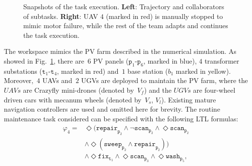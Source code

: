 \begin{figure}[t!]
\begin{minipage}[t]{0.49\linewidth}
\end{minipage}%
\caption{Snapshots of the task execution. \textbf{Left}:
Trajectory and collaborators of subtasks.
\textbf{Right}: UAV $4$ (marked in red) is manually stopped to mimic motor failure,
while the rest of the team adapts and continues
the task execution.}
\label{fig:ws}
\end{figure}

The workspace mimics the PV farm described in the numerical simulation.
As showed in Fig.~\ref{fig:ws},
there are~$6$ PV panels ($\texttt{p}_1$-$\texttt{p}_6$, marked in blue),
$4$ transformer substations
($\texttt{t}_1$-$\texttt{t}_4$, marked in red)
and~$1$ base station ($b_1$ marked in yellow).
Moreover,~$4$ UAVs and~$2$ UGVs are deployed to maintain the PV farm,
where the $UAVs$ are Crazyfly mini-drones (denoted by~$V_f$) and
the $UGVs$ are four-wheel driven cars with mecanum wheels (denoted by~$V_s$, $V_l$).
Existing mature navigation controllers are used and omitted here for brevity.
The routine maintenance task considered can be specified with the following LTL formulas:
\begin{equation}
\begin{aligned}
	\varphi_4=& \Diamond(\texttt{repair}_{\texttt{p}_2} \land  \lnot\texttt{scan}_{\texttt{p}_2} \land \Diamond
	\texttt{scan}_{\texttt{p}_2} \\
	&\land \Diamond (\texttt{sweep}_{\texttt{p}_2} \land \texttt{repair}_{\texttt{p}_2}) )\\ 
	& \land \Diamond \texttt{fix}_{\texttt{t}_1} \land \Diamond \texttt{scan}_{\texttt{p}_3}
	\land \Diamond \texttt{wash}_{\texttt{p}_5},
\end{aligned}
\end{equation}

